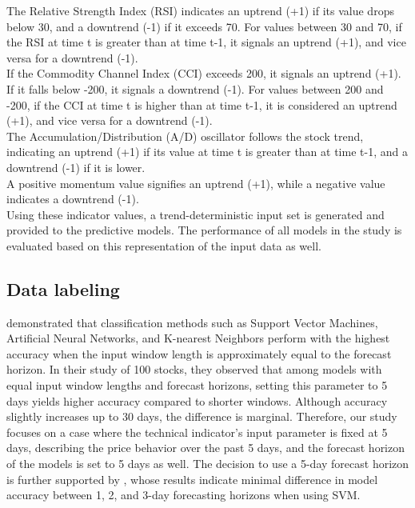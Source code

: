 \documentclass[aodsor,preprint]{imsart}
\numberwithin{equation}{section}
\theoremstyle{plain}
\begin{document}
The Relative Strength Index (RSI) indicates an uptrend (+1) if its value drops below 30, and a downtrend (-1) if it exceeds 70. For values between 30 and 70, if the RSI at time t is greater than at time t-1, it signals an uptrend (+1), and vice versa for a downtrend (-1). \\

If the Commodity Channel Index (CCI) exceeds 200, it signals an uptrend (+1). If it falls below -200, it signals a downtrend (-1). For values between 200 and -200, if the CCI at time t is higher than at time t-1, it is considered an uptrend (+1), and vice versa for a downtrend (-1). \\

The Accumulation/Distribution (A/D) oscillator follows the stock trend, indicating an uptrend (+1) if its value at time t is greater than at time t-1, and a downtrend (-1) if it is lower. \\

A positive momentum value signifies an uptrend (+1), while a negative value indicates a downtrend (-1). \\

Using these indicator values, a trend-deterministic input set is generated and provided to the predictive models. The performance of all models in the study is evaluated based on this representation of the input data as well.

\subsection{Data labeling} 

\cite{shynkevich2017} demonstrated that classification methods such as Support Vector Machines, Artificial Neural Networks, and K-nearest Neighbors perform with the highest accuracy when the input window length is approximately equal to the forecast horizon. In their study of 100 stocks, they observed that among models with equal input window lengths and forecast horizons, setting this parameter to 5 days yields higher accuracy compared to shorter windows. Although accuracy slightly increases up to 30 days, the difference is marginal. Therefore, our study focuses on a case where the technical indicator's input parameter is fixed at 5 days, describing the price behavior over the past 5 days, and the forecast horizon of the models is set to 5 days as well. The decision to use a 5-day forecast horizon is further supported by \cite{zhou2020}, whose results indicate minimal difference in model accuracy between 1, 2, and 3-day forecasting horizons when using SVM.
\end{document}

